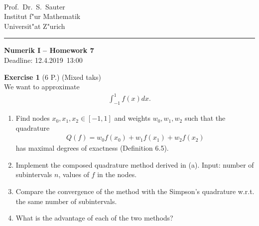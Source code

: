 \documentclass[11pt,a4paper,german]{scrartcl}
\def\blnr{7}              %
\def\sdate{12.4.2019}    %
\theoremstyle{break}   %
\begin{document}
\parbox{0ex}{    }   \\

\parbox{25ex}{
  Prof.~Dr.~S.~Sauter\\
  Institut f"ur Mathematik\\
  Universit"at Z"urich
  }
%
\rule[0cm]{0.cm}{.01cm}
\hfill  \parbox{0.6\textwidth}{
  {\sffamily\LARGE\bfseries Numerik I}
  {\sffamily\Large\bfseries \;\;--\;\; Homework \blnr }\\[1.5ex]
  Deadline: \sdate\ 13:00
  }
  
  
\vspace{10ex}

\textbf{Exercise 1} (6 P.) (Mixed taks) \\
We want to approximate
\begin{align*}
\int_{-1}^1 f(x)dx.
\end{align*}
\begin{enumerate}
\item Find nodes \(x_0,x_1,x_2 \in [-1,1]\) and weights \(w_0,w_1,w_2\) such that the quadrature 
\begin{align*}
Q(f) = w_0 f(x_0) + w_1 f(x_1) +w_2 f(x_2)
\end{align*}
has maximal degrees of exactness (Definition 6.5).
\item Implement the composed quadrature method derived in (a). Input: number of subintervals \(n\), values of \(f\) in the nodes.
\item Compare the convergence of the method with the Simpson's quadrature w.r.t. the same number of subintervals. 
\item What is the advantage of each of the two methods?
\end{enumerate}
\vspace{4ex}
\end{document}
